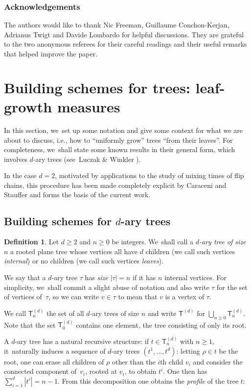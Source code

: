 \documentclass[11pt]{article}
\newcommand{\Subsection}{\subsection}
\newcommand{\sT}{\mathsf{T}}
\theoremstyle{definition}
\newtheorem{defn}[thm]{Definition}
\begin{document}
\subsubsection*{Acknowledgements}
The authors would like to thank Nic Freeman, Guillaume Conchon-Kerjan, Adrianus Twigt and Davide Lombardo for helpful discussions. They are grateful to the two anonymous referees for their careful readings and their useful remarks that helped improve the paper.

\section{Building schemes for trees: leaf-growth measures}\label{section:building schemes}

In this section, we~set up some notation and give some context for what we are about to discuss, i.e., how to ``uniformly grow'' trees ``from their leaves''. For completeness, we~shall state some known results in their general form, which involves $d$-ary trees (see~Luczak \& Winkler \cite{LW04}).

In the case $d=2$, motivated by applications to the study of mixing times of flip chains, this procedure has been made completely explicit by Caraceni and Stauffer \cite{CS20} and forms the basis of the current work.

\Subsection{Building schemes for $d$-ary trees}

\begin{defn}\label{def:complete d-ary tree}
Let $d\!\geq\! 2$ and $n\!\geq\! 0$ be integers. We~shall call a \emph{$d$-ary tree of size~$n$} a rooted plane tree whose vertices all have $d$ children (we call such vertices \emph{internal}) or no children (we call such vertices \emph{leaves}).

We say that a $d$-ary tree $\tau$ has \emph{size} $|\tau|=n$ if it has $n$ internal vertices. For simplicity, we~shall commit a slight abuse of notation and also write $\tau$ for the set of vertices of~$\tau$, so we can write $v\in \tau$ to mean that $v$ is a vertex of $\tau$.

We call $\sT_n^{(d)}$ the set of all $d$-ary trees of size $n$ and write $\sT^{(d)}$ for $\bigcup_{n\geq 0}\sT_n^{(d)}$. Note that the set $\sT^{(d)}_0$ contains one element, the tree consisting of only its root.
\end{defn}

A $d$-ary tree has a natural recursive structure: if $t\in\sT_n^{(d)}$ with $n\geq 1$, it~naturally induces a sequence of $d$-ary trees $(t^1,\ldots, t^d)$: letting $\rho\in t$ be the root, one can erase all children of $\rho$ other than the $i$th child $v_i$ and consider the connected component of~$v_i$, rooted at $v_i$, to obtain $t^i$. One then has $\sum_{i=1}^d|t^i|=n-1$. From this decomposition one obtains the \emph{profile} of the tree $t$:
\end{document}
